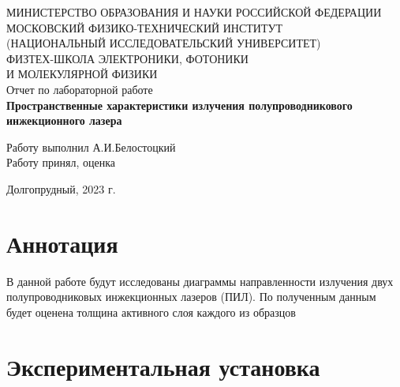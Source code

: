 \documentclass[a4paper,12pt]{article}
\begin{document}
 

\begin{titlepage}
	\begin{center}
		\large 	МИНИСТЕРСТВО ОБРАЗОВАНИЯ И НАУКИ РОССИЙСКОЙ ФЕДЕРАЦИИ\\
				МОСКОВСКИЙ ФИЗИКО-ТЕХНИЧЕСКИЙ ИНСТИТУТ \\
				(НАЦИОНАЛЬНЫЙ ИССЛЕДОВАТЕЛЬСКИЙ УНИВЕРСИТЕТ)\\ 
				ФИЗТЕХ-ШКОЛА ЭЛЕКТРОНИКИ, ФОТОНИКИ \\
				И МОЛЕКУЛЯРНОЙ ФИЗИКИ \\
		
		
		\vspace{4.0 cm}
		\LARGE{Отчет по лабораторной работе} \\ 
		\LARGE \textbf{Пространственные характеристики излучения полупроводникового инжекционного лазера} \\
	\end{center}
	\vspace{3 cm} \large

	\begin{flushleft}
		Работу выполнил \hspace{5.5cm}  \underline{\hspace{3cm}} А.И.Белостоцкий \\	
		\vspace{2cm}
		Работу принял, оценка \hspace{4.3cm} \underline{\hspace{3cm}}
	\end{flushleft}
	
	
	\vfill

	\begin{center}
	Долгопрудный, 2023 г.
	\end{center}
\end{titlepage}           

\tableofcontents

\newpage

\section{Аннотация}

В данной работе будут исследованы диаграммы направленности излучения двух полупроводниковых инжекционных лазеров (ПИЛ). По полученным данным будет оценена толщина активного слоя каждого из образцов

\section{Экспериментальная установка} 
\end{document}
